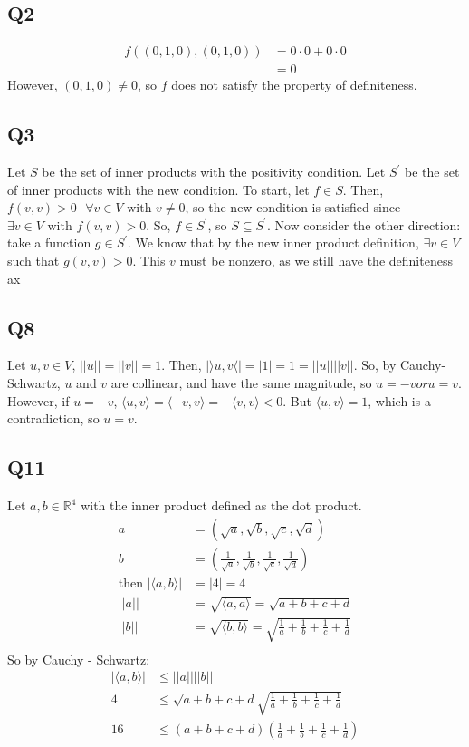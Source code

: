 \documentclass{article}
\begin{document}
\subsection*{Q2}
	\begin{align*}
		f((0, 1, 0), (0, 1, 0)) &= 0 \cdot 0 + 0\cdot 0\\
		&=0
	\end{align*}
	However, $(0, 1, 0) \neq 0$, so $f$ does not satisfy the property of definiteness.
	
\subsection*{Q3}
Let $S$ be the set of inner products with the positivity condition. 
Let  $S^\prime$ be the set of inner products with the new condition. To start, let $f \in S$. Then, $f(v, v) > 0 \text{ } \forall v \in V \text{ with } v \neq 0$, so the new condition is satisfied since $\exists v \in V \text{ with } f(v, v) > 0$. So, $f \in S^\prime$, so $S \subseteq S^\prime$. 
Now consider the other direction: take a function $g \in S^\prime$. We know that by the new inner product definition, $\exists v \in V$ such that $g(v, v) > 0$. This $v$ must be nonzero, as we still have the definiteness ax

\subsection*{Q8}
Let $u, v \in V$, $||u|| = ||v|| = 1$. Then, $|\rangle u, v \langle| = |1| = 1 = ||u|| ||v||$. So, by Cauchy-Schwartz, $u$ and $v$ are collinear, and have the same magnitude, so $u = -v or u = v$. However, if $u = -v$, $\langle u, v \rangle = \langle -v, v \rangle = - \langle v, v \rangle < 0$. But $\langle u, v \rangle = 1$, which is a contradiction, so $u = v$.

\subsection*{Q11}
Let $a,b \in \mathbb{R}^4$ with the inner product defined as the dot product. 
\begin{align*}
	a &= (\sqrt{a}, \sqrt{b}, \sqrt{c}, \sqrt{d})\\
	b &= (\frac{1}{\sqrt{a}}, \frac{1}{\sqrt{b}}, \frac{1}{\sqrt{c}},\frac{1}{\sqrt{d}})\\
	\text{then } |\langle a, b \rangle| &= |4| = 4\\ 
	||a|| &= \sqrt{\langle a, a \rangle} = \sqrt{a + b + c + d}\\
	||b|| &= \sqrt{\langle b, b \rangle} = \sqrt{\frac{1}{a} + \frac{1}{b} + \frac{1}{c} + \frac{1}{d}}\\
\end{align*}
So by Cauchy - Schwartz:
\begin{align*}
	|\langle a, b \rangle| &\leq ||a|| ||b||\\
	4 &\leq \sqrt{a + b + c + d} \sqrt{\frac{1}{a} + \frac{1}{b} + \frac{1}{c} + \frac{1}{d}}\\
	16 &\leq (a+b+c+d)(\frac{1}{a} + \frac{1}{b}+ \frac{1}{c}+\frac{1}{d})\\
\end{align*}
\end{document}
